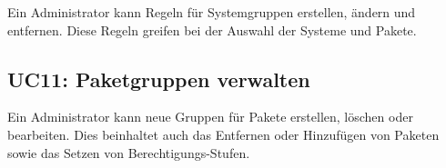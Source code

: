 Ein Administrator kann Regeln für Systemgruppen erstellen, ändern und entfernen. Diese Regeln greifen bei der Auswahl der Systeme und Pakete.

\subsection*{UC11: Paketgruppen verwalten}
\label{sec:uc_11}

Ein Administrator kann neue Gruppen für Pakete erstellen, löschen oder bearbeiten. Dies beinhaltet auch das Entfernen oder Hinzufügen von Paketen sowie das Setzen von Berechtigungs-Stufen.
